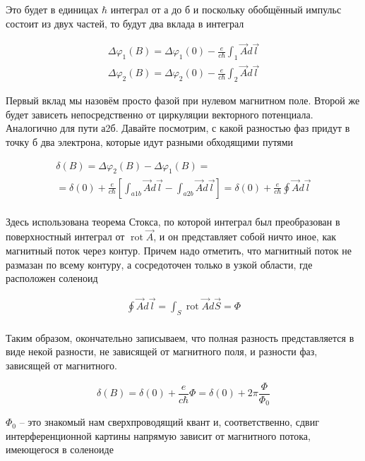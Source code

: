 \documentclass[a4paper, 14pt]{article}
\begin{document}
    Это будет в единицах $\hbar$ интеграл от а до б и поскольку обобщённый импульс состоит из двух частей, то будут два
    вклада в интеграл
    
    \begin{gather}
        \Delta \varphi_1(B) = \Delta \varphi_1(0) - \frac{e}{c \hbar} \int_1 \vec{A} d \vec{l} \\
        \Delta \varphi_2(B) = \Delta \varphi_2(0) - \frac{e}{c \hbar} \int_2 \vec{A} d \vec{l}
    \end{gather}
    
    Первый вклад мы назовём просто фазой при нулевом магнитном поле.
    Второй же будет зависеть непосредственно от циркуляции векторного потенциала.
    Аналогично для пути а2б.
    Давайте посмотрим, с какой разностью фаз придут в точку б два электрона, которые идут разными обходящими путями
    
    \begin{gather}
        \delta(B) = \Delta \varphi_2(B) - \Delta \varphi_1(B) = \\
        = \delta(0) + \frac{e}{c \hbar}\left[\int_{a1b} \vec{A} d \vec{l} - \int_{a2b} \vec{A} d \vec{l} \right] =
        \delta(0) + \frac{e}{c \hbar} \oint \vec{A} d \vec{l} \\
    \end{gather}
    
    Здесь использована теорема Стокса, по которой интеграл был преобразован в поверхностный интеграл от
    $\operatorname{rot} \vec{A}$, и он представляет собой ничто иное, как магнитный поток через контур.
    Причем надо отметить, что магнитный поток не размазан по всему контуру, а сосредоточен только в узкой области,
    где расположен соленоид
    
    \begin{gather}
        \oint \vec{A} d \vec{l} = \int_S \operatorname{rot} \vec{A} d \vec{S} = \Phi \\
    \end{gather}
    
    Таким образом, окончательно записываем, что полная разность представляется в виде некой разности, не зависящей
    от магнитного поля, и разности фаз, зависящей от магнитного.
    
    \[ \delta(B) = \delta(0) + \frac{e}{c \hbar} \Phi = \delta(0) + 2 \pi \frac{\Phi}{\Phi_0} \]
    
    $\Phi_0$ -- это знакомый нам сверхпроводящий квант и, соответственно, сдвиг интерференционной картины напрямую
    зависит от магнитного потока, имеющегося в соленоиде
    
\end{document}
